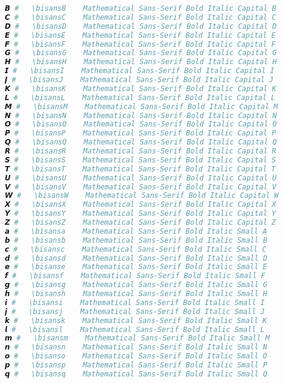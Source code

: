 \begin{lstlisting}[language=Julia, style=julia]
𝘽 #   \bisansB    Mathematical Sans-Serif Bold Italic Capital B
𝘾 #   \bisansC    Mathematical Sans-Serif Bold Italic Capital C
𝘿 #   \bisansD    Mathematical Sans-Serif Bold Italic Capital D
𝙀 #   \bisansE    Mathematical Sans-Serif Bold Italic Capital E
𝙁 #   \bisansF    Mathematical Sans-Serif Bold Italic Capital F
𝙂 #   \bisansG    Mathematical Sans-Serif Bold Italic Capital G
𝙃 #   \bisansH    Mathematical Sans-Serif Bold Italic Capital H
𝙄 #   \bisansI    Mathematical Sans-Serif Bold Italic Capital I
𝙅 #   \bisansJ    Mathematical Sans-Serif Bold Italic Capital J
𝙆 #   \bisansK    Mathematical Sans-Serif Bold Italic Capital K
𝙇 #   \bisansL    Mathematical Sans-Serif Bold Italic Capital L
𝙈 #   \bisansM    Mathematical Sans-Serif Bold Italic Capital M
𝙉 #   \bisansN    Mathematical Sans-Serif Bold Italic Capital N
𝙊 #   \bisansO    Mathematical Sans-Serif Bold Italic Capital O
𝙋 #   \bisansP    Mathematical Sans-Serif Bold Italic Capital P
𝙌 #   \bisansQ    Mathematical Sans-Serif Bold Italic Capital Q
𝙍 #   \bisansR    Mathematical Sans-Serif Bold Italic Capital R
𝙎 #   \bisansS    Mathematical Sans-Serif Bold Italic Capital S
𝙏 #   \bisansT    Mathematical Sans-Serif Bold Italic Capital T
𝙐 #   \bisansU    Mathematical Sans-Serif Bold Italic Capital U
𝙑 #   \bisansV    Mathematical Sans-Serif Bold Italic Capital V
𝙒 #   \bisansW    Mathematical Sans-Serif Bold Italic Capital W
𝙓 #   \bisansX    Mathematical Sans-Serif Bold Italic Capital X
𝙔 #   \bisansY    Mathematical Sans-Serif Bold Italic Capital Y
𝙕 #   \bisansZ    Mathematical Sans-Serif Bold Italic Capital Z
𝙖 #   \bisansa    Mathematical Sans-Serif Bold Italic Small A
𝙗 #   \bisansb    Mathematical Sans-Serif Bold Italic Small B
𝙘 #   \bisansc    Mathematical Sans-Serif Bold Italic Small C
𝙙 #   \bisansd    Mathematical Sans-Serif Bold Italic Small D
𝙚 #   \bisanse    Mathematical Sans-Serif Bold Italic Small E
𝙛 #   \bisansf    Mathematical Sans-Serif Bold Italic Small F
𝙜 #   \bisansg    Mathematical Sans-Serif Bold Italic Small G
𝙝 #   \bisansh    Mathematical Sans-Serif Bold Italic Small H
𝙞 #   \bisansi    Mathematical Sans-Serif Bold Italic Small I
𝙟 #   \bisansj    Mathematical Sans-Serif Bold Italic Small J
𝙠 #   \bisansk    Mathematical Sans-Serif Bold Italic Small K
𝙡 #   \bisansl    Mathematical Sans-Serif Bold Italic Small L
𝙢 #   \bisansm    Mathematical Sans-Serif Bold Italic Small M
𝙣 #   \bisansn    Mathematical Sans-Serif Bold Italic Small N
𝙤 #   \bisanso    Mathematical Sans-Serif Bold Italic Small O
𝙥 #   \bisansp    Mathematical Sans-Serif Bold Italic Small P
𝙦 #   \bisansq    Mathematical Sans-Serif Bold Italic Small Q

\end{lstlisting}
